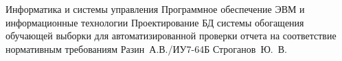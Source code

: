 \documentclass{bmstu}[a4paper]
\begin{document}
	\makecourseworktitle	
	{Информатика и системы управления} %
	{Программное обеспечение ЭВМ и информационные технологии} %
	{Проектирование БД системы обогащения обучающей выборки для автоматизированной проверки отчета на соответствие нормативным требованиям} %
	{Разин~А.В./ИУ7-64Б} %
	{Строганов~Ю.~В.} %
	{} %
	
	\setcounter{page}{3}
	\maketableofcontents

	
	
	
	
	
	


	\makebibliography

	
\end{document}
